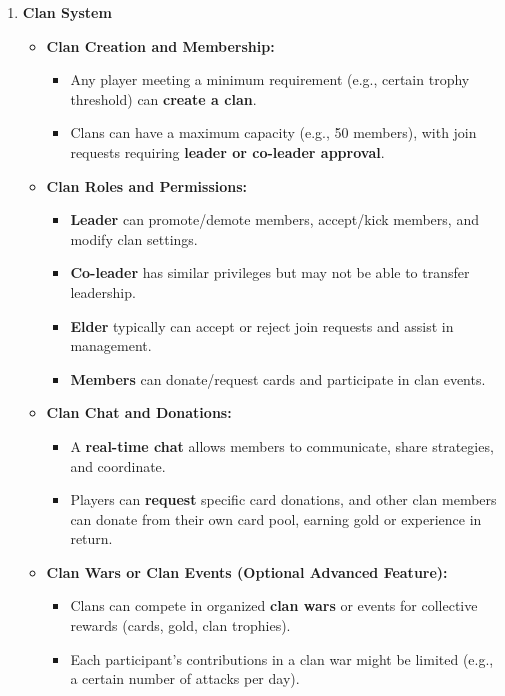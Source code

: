 \documentclass{article}
\begin{document}
\begin{enumerate}[label=\textbf{FR\arabic*.}]
\item \textbf{Clan System}
\begin{itemize}
    \item \textbf{Clan Creation and Membership:}
    \begin{itemize}
        \item Any player meeting a minimum requirement (e.g., certain trophy threshold) can \textbf{create a clan}.
        \item Clans can have a maximum capacity (e.g., 50 members), with join requests requiring \textbf{leader or co-leader approval}.
    \end{itemize}
    \item \textbf{Clan Roles and Permissions:}
    \begin{itemize}
        \item \textbf{Leader} can promote/demote members, accept/kick members, and modify clan settings.
        \item \textbf{Co-leader} has similar privileges but may not be able to transfer leadership.
        \item \textbf{Elder} typically can accept or reject join requests and assist in management.
        \item \textbf{Members} can donate/request cards and participate in clan events.
    \end{itemize}
    \item \textbf{Clan Chat and Donations:}
    \begin{itemize}
        \item A \textbf{real-time chat} allows members to communicate, share strategies, and coordinate.
        \item Players can \textbf{request} specific card donations, and other clan members can donate from their own card pool, earning gold or experience in return.
    \end{itemize}
    \item \textbf{Clan Wars or Clan Events (Optional Advanced Feature):}
    \begin{itemize}
        \item Clans can compete in organized \textbf{clan wars} or events for collective rewards (cards, gold, clan trophies).
        \item Each participant’s contributions in a clan war might be limited (e.g., a certain number of attacks per day).
    \end{itemize}
\end{itemize}


\end{enumerate}
\end{document}
